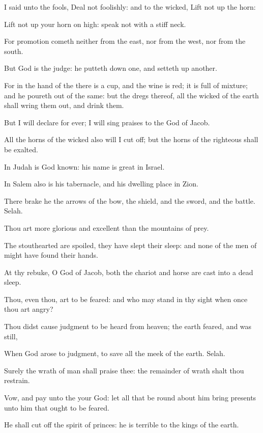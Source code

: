 \Verse I said unto the fools, Deal not foolishly: and to the wicked, Lift not up the horn:

\Verse Lift not up your horn on high: speak not with a stiff neck.

\Verse For promotion cometh neither from the east, nor from the west, nor from the south.

\Verse But God is the judge: he putteth down one, and setteth up another.

\Verse For in the hand of the \LORD there is a cup, and the wine is red; it is full of mixture; and he poureth out of the same: but the dregs thereof, all the wicked of the earth shall wring them out, and drink them.

\Verse But I will declare for ever; I will sing praises to the God of Jacob.

\Verse All the horns of the wicked also will I cut off; but the horns of the righteous shall be exalted.




\Chapter
\Verse In Judah is God known: his name is great in Israel.

\Verse In Salem also is his tabernacle, and his dwelling place in Zion.

\Verse There brake he the arrows of the bow, the shield, and the sword, and the battle. Selah.

\Verse Thou art more glorious and excellent than the mountains of prey.

\Verse The stouthearted are spoiled, they have slept their sleep: and none of the men of might have found their hands.

\Verse At thy rebuke, O God of Jacob, both the chariot and horse are cast into a dead sleep.

\Verse Thou, even thou, art to be feared: and who may stand in thy sight when once thou art angry?

\Verse Thou didst cause judgment to be heard from heaven; the earth feared, and was still,

\Verse When God arose to judgment, to save all the meek of the earth.  Selah.

\Verse Surely the wrath of man shall praise thee: the remainder of wrath shalt thou restrain.

\Verse Vow, and pay unto the \LORD your God: let all that be round about him bring presents unto him that ought to be feared.

\Verse He shall cut off the spirit of princes: he is terrible to the kings of the earth.




